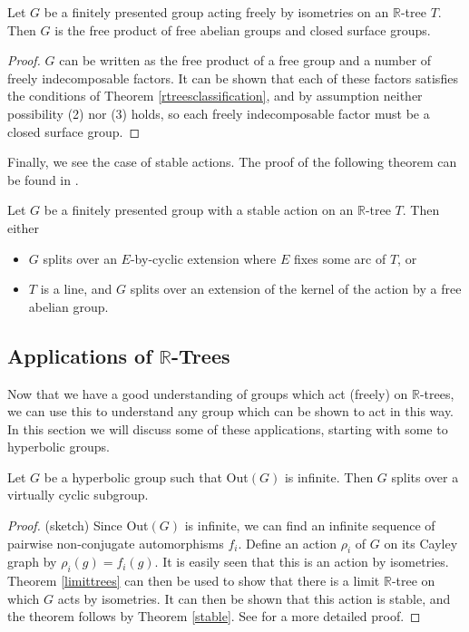 \begin{theorem}
    Let $G$ be a finitely presented group acting freely by isometries on an $\mathbb{R}$-tree $T$. Then $G$ is the free product of free abelian groups and closed surface groups.
\end{theorem}
\begin{proof}
    $G$ can be written as the free product of a free group and a number of freely indecomposable factors. It can be shown that each of these factors satisfies the conditions of Theorem \ref{rtreesclassification}, and by assumption neither possibility (2) nor (3) holds, so each freely indecomposable factor must be a closed surface group. 
\end{proof}

Finally, we see the case of stable actions. The proof of the following theorem can be found in \cite{Bestvina2}.

\begin{theorem}\label{stable}
    Let $G$ be a finitely presented group with a stable action on an $\mathbb{R}$-tree $T$. Then either
    \begin{itemize}
        \item $G$ splits over an $E$-by-cyclic extension where $E$ fixes some arc of $T$, or
        \item $T$ is a line, and $G$ splits over an extension of the kernel of the action by a free abelian group.
    \end{itemize}
\end{theorem}

\subsection{Applications of $\mathbb{R}$-Trees}
Now that we have a good understanding of groups which act (freely) on $\mathbb{R}$-trees, we can use this to understand any group which can be shown to act in this way. In this section we will discuss some of these applications, starting with some to hyperbolic groups.

\begin{theorem}
    Let $G$ be a hyperbolic group such that Out$(G)$ is infinite. Then $G$ splits over a virtually cyclic subgroup.
\end{theorem}

\begin{proof} (sketch)
    Since Out$(G)$ is infinite, we can find an infinite sequence of pairwise non-conjugate automorphisms $f_i$. Define an action $\rho_i$ of $G$ on its Cayley graph by $\rho_i(g)=f_i(g)$. It is easily seen that this is an action by isometries. Theorem \ref{limittrees} can then be used to show that there is a limit $\mathbb{R}$-tree on which $G$ acts by isometries. It can then be shown that this action is stable, and the theorem follows by Theorem \ref{stable}. See \cite{BridsonSwarup} for a more detailed proof.
\end{proof}

